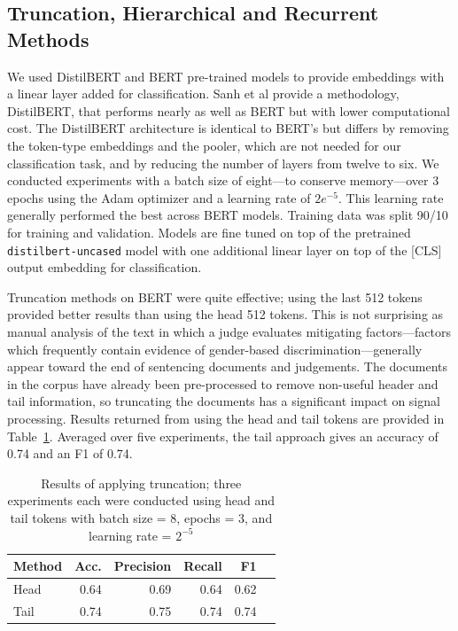 \documentclass[twocolumn,10pt]{wmrDoc}
\begin{document}
\subsection{Truncation, Hierarchical and Recurrent Methods }
We used DistilBERT and BERT pre-trained models to provide embeddings with a linear layer added for classification. Sanh et al \cite{sanh} provide a methodology, DistilBERT, that performs nearly as well as BERT but with lower computational cost. The DistilBERT architecture is identical to BERT's but differs by removing the token-type embeddings and the pooler, which are not needed for our classification task, and by reducing the number of layers from twelve to six. We conducted experiments with a batch size of eight---to conserve memory---over 3 epochs using the Adam optimizer and a learning rate of $2e^{-5}$.  This learning rate generally performed the best across BERT models. Training data was split 90/10 for training and validation.  Models are fine tuned on top of the pretrained  \verb|distilbert-uncased| model  with one additional linear layer on top of the [CLS] output embedding for classification.

Truncation methods on BERT were quite effective; using the last 512 tokens provided better results than using the head 512 tokens. This is not surprising as manual analysis of the text in which a judge evaluates mitigating factors---factors which frequently contain evidence of gender-based discrimination---generally appear toward the end of sentencing documents and judgements.  The documents in the corpus have already been pre-processed to remove non-useful header and tail information, so truncating the documents has a significant impact on signal processing.  Results returned from using the head and tail tokens are provided in Table~\ref{tab:headtail}. Averaged over five experiments, the tail approach gives an accuracy of 0.74 and an F1 of 0.74.

\begin{table}
 \caption{Results of applying truncation; three experiments each were conducted using head and tail tokens with batch size = 8, epochs = 3, and learning rate = $2^{-5}$}
  \centering
  \begin{tabular}{lrrrrr}
    \toprule
    Method & Acc. & Precision & Recall & F1\\
    \midrule
    Head & 0.64 & 0.69 & 0.64 & 0.62 \\
    Tail & 0.74 & 0.75 & 0.74 & 0.74  \\
    \bottomrule
  \end{tabular}
  \label{tab:headtail}
\end{table}
\end{document}
